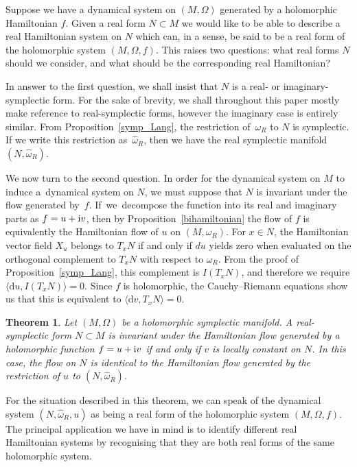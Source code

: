 \documentclass[pdftex]{sigma}
\numberwithin{equation}{section}
\newtheorem{Theorem}{Theorem}[section]
\begin{document}
Suppose we have a dynamical system on $(M,\Omega)$ generated by a holomorphic Hamiltonian $f$. Given a real form $N\subset M$ we would like to be able to describe a real Hamiltonian system on $N$ which can, in a sense, be said to be a real form of the holomorphic system $(M,\Omega,f)$. This raises two questions: what real forms $N$ should we consider, and what should be the corresponding real Hamiltonian?

In answer to the first question, we shall insist that $N$ is a real- or imaginary-symplectic form. For the sake of brevity, we shall throughout this paper mostly make reference to real-symplectic forms, however the imaginary case is entirely similar. From Proposition~\ref{symp_Lang}, the restriction of~$\omega_R$ to $N$ is symplectic. If we write this restriction as~$\widehat{\omega}_R$, then we have the real symplectic manifold~$(N,\widehat{\omega}_R)$.

We now turn to the second question. In order for the dynamical system on $M$ to induce a~dynamical system on $N$, we must suppose that $N$ is invariant under the flow generated by~$f$. If~we~decompose the function into its real and imaginary parts as $f=u+{\rm i}v$, then by Proposition~\ref{bihamiltonian} the flow of $f$ is equivalently the Hamiltonian flow of $u$ on $(M,\omega_R)$. For $x\in N$, the Hamiltonian vector field $X_u$ belongs to $T_xN$ if and only if $du$ yields zero when evaluated on the orthogonal complement to $T_xN$ with respect to $\omega_R$. From the proof of Proposition~\ref{symp_Lang}, this complement is $I(T_xN)$, and therefore we require $\langle \mathrm{d}u, I(T_xN)\rangle=0$. Since $f$ is holomorphic, the Cauchy--Riemann equations show us that this is equivalent to $\langle \mathrm{d}v, T_xN\rangle=0$.
\begin{Theorem}Let $(M,\Omega)$ be a holomorphic symplectic manifold. A real-symplectic form ${N\subset M}$ is invariant under the Hamiltonian flow generated by a holomorphic function $f=u+{\rm i}v$ if and only if $v$ is locally constant on $N$. In this case, the flow on $N$ is identical to the Hamiltonian flow generated by the restriction of $u$ to $(N,\widehat{\omega}_R)$.
\end{Theorem}
For the situation described in this theorem, we can speak of the dynamical system $(N,\widehat{\omega}_R,u)$ as being a real form of the holomorphic system $(M,\Omega,f)$. The principal application we have in mind is to identify different real Hamiltonian systems by recognising that they are both real forms of the same holomorphic system.
\end{document}
